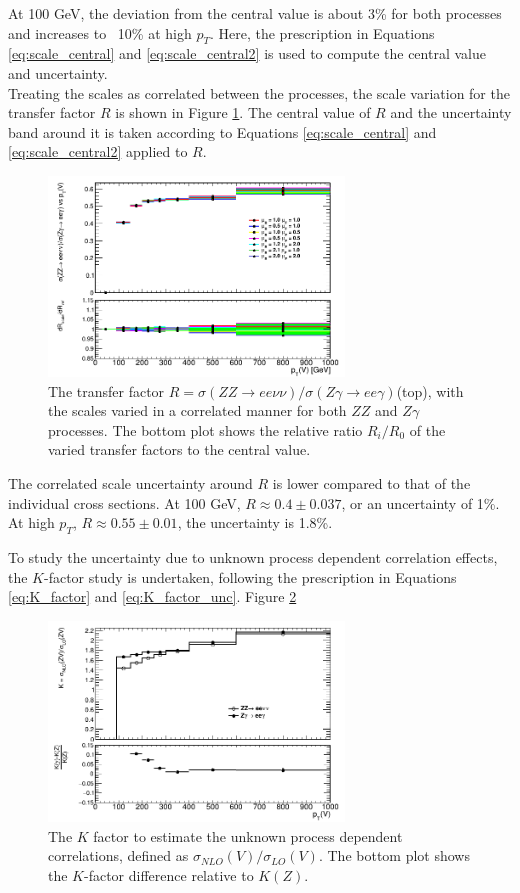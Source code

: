 \documentclass[11pt,a4paper,openright,twoside]{report}
\begin{document}
At 100 GeV, the deviation from the central value is about 3\% for both processes and increases to ~10\% at high $p_T$. Here, the prescription in Equations \ref{eq:scale_central} and \ref{eq:scale_central2} is used to compute the central value and uncertainty.\\ Treating the scales as correlated between the processes, the scale variation for the transfer factor $R$ is shown in Figure \ref{fig:R_scale}. The central value of $R$ and the uncertainty band around it is taken according to Equations \ref{eq:scale_central} and \ref{eq:scale_central2} applied to $R$.
\begin{figure}[H]
\centering
\includegraphics[width=0.7\textwidth]{R_scale.png}
\caption{The transfer factor $R = \sigma(ZZ\to ee\nu\nu)/\sigma(Z\gamma\to ee\gamma)$(top), with the scales varied in a correlated manner for both $ZZ$ and $Z\gamma$ processes. The bottom plot shows the relative ratio $R_i/R_0$ of the varied transfer factors to the central value.}
\label{fig:R_scale}
\end{figure}
The correlated scale uncertainty around $R$ is lower compared to that of the individual cross sections. At 100 GeV, $R \approx 0.4 \pm 0.037$, or an uncertainty of 1\%. At high $p_T$, $R\approx 0.55 \pm 0.01$, the uncertainty is 1.8\%.

To study the uncertainty due to unknown process dependent correlation effects, the $K$-factor study is undertaken, following the prescription in Equations \ref{eq:K_factor} and \ref{eq:K_factor_unc}. Figure \ref{fig:K_pt}
\begin{figure}[H]
\centering
	\includegraphics[width=0.7\textwidth]{K_pt.png}
	\caption{The $K$ factor to estimate the unknown process dependent correlations, defined as $\sigma_{NLO}(V)/\sigma_{LO}(V)$. The bottom plot shows the $K$-factor difference relative to $K(Z)$.}
	\label{fig:K_pt}
\end{figure}
\end{document}
